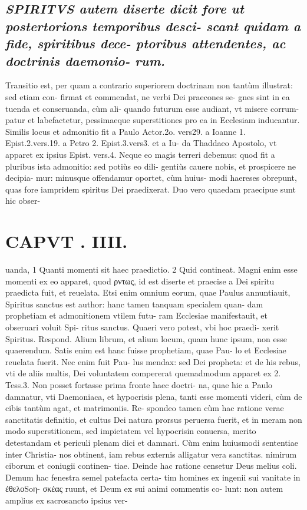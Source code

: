 \documentclass{article}
\begin{document}
\begin{pages}
\subsection*{\textit{\huge\textbf{S}\normalsize PIRITVS autem diserte dicit fore ut postertorions temporibus desci- scant quidam a fide, spiritibus dece- ptoribus attendentes, ac doctrinis daemonio- rum. }}\pstart Transitio est, per quam a contrario superiorem doctrinam non tantùm illustrat: sed etiam con- firmat et commendat, ne verbi Dei praecones se- gnes sint in ea tuenda et conseruanda, cùm ali- quando futurum esse audiant, vt misere corrum- patur et labefactetur, pessimaeque superstitiones pro ea in Ecclesiam inducantur. Similis locus et admonitio fit a Paulo Actor.2o. vers29. a Ioanne 1. Epist.2.vers.19. a Petro 2. Epist.3.vers3. et a Iu- da Thaddaeo Apostolo, vt apparet ex ipsius Epist. vers.4. Neque eo magis terreri debemus: quod fit a pluribus ista admonitio: sed potiùs eo dili- gentiùs cauere nobis, et prospicere ne decipia- mur: minusque offendamur oportet, cùm huius- modi haereses obrepunt, quas fore iampridem spiritus Dei praedixerat.  \pend\pstart Duo vero quaedam praecipue sunt hic obser-  \pend
\section*{CAPVT . IIII. }
\marginpar{[ p.181 ]}\pstart uanda, 1 Quanti momenti sit haec praedictio. 2 Quid contineat. Magni enim esse momenti ex eo apparet, quod ρντως, id est diserte et praecise a Dei spiritu praedicta fuit, et reuelata. Etsi enim omnium eorum, quae Paulus annuntiauit, Spiritus sanctus est author: hanc tamen tanquam specialem quan- dam prophetiam et admonitionem vtilem futu- ram Ecclesiae manifestauit, et obseruari voluit Spi- ritus sanctus. Quaeri vero potest, vbi hoc praedi- xerit Spiritus. Respond. Alium librum, et alium locum, quam hunc ipsum, non esse quaerendum. Satis enim est hanc fuisse prophetiam, quae Pau- lo et Ecclesiae reuelata fuerit. Nec enim fuit Pau- lus mendax: sed Dei propheta: et de his rebus, vti de aliis multis, Dei voluntatem compererat quemadmodum apparet ex 2. Tess.3.  \pend\pstart Non posset fortasse prima fronte haec doctri- na, quae hic a Paulo damnatur, vti Daemoniaca, et hypocrisis plena, tanti esse momenti videri, cùm de cibis tantùm agat, et matrimoniis. Re- spondeo tamen cùm hac ratione verae sanctitatis definitio, et cultus Dei natura prorsus peruersa fuerit, et in meram non modo superstitionem, sed impietatem vel hypocrisin conuersa, merito detestandam et periculi plenam dici et damnari. Cùm enim huiusmodi sententiae inter Christia- nos obtinent, iam rebus externis alligatur vera sanctitas. nimirum ciborum et coniugii continen- tiae. Deinde hac ratione censetur Deus melius coli. Demum hac fenestra semel patefacta certa- tim homines ex ingenii sui vanitate in ἐθελοSoη- σκέας ruunt, et Deum ex sui animi commentis co- lunt: non autem amplius ex sacrosancto ipsius ver-  \pend

\end{pages}
\end{document}
